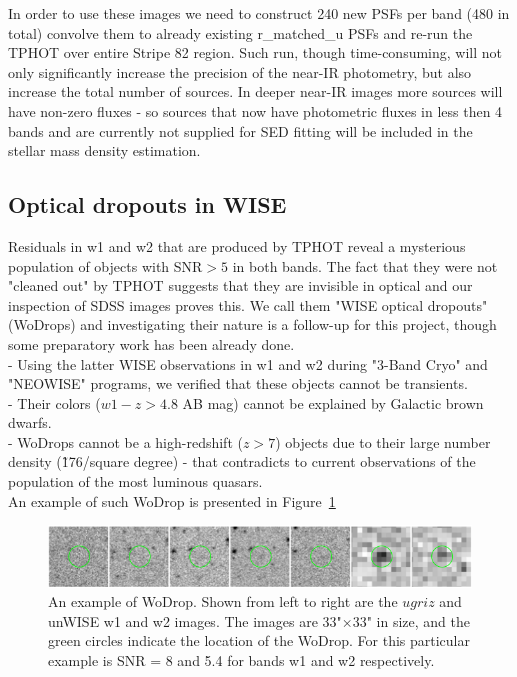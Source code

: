In order to use these images we need to construct 240 new PSFs per band (480 in total) convolve them to already existing r\_matched\_u PSFs and re-run the TPHOT over entire Stripe 82 region. Such run, though time-consuming, will not only significantly increase the precision of the near-IR photometry, but also increase the total number of sources. In deeper near-IR images more sources will have non-zero fluxes - so sources that now have photometric fluxes in less then 4 bands and are currently not supplied for SED fitting will be included in the stellar mass density estimation. 

\subsection{Optical dropouts in WISE}
Residuals in w1 and w2 that are produced by TPHOT reveal a mysterious population of objects with SNR$>5$ in both bands. The fact that they were not "cleaned out" by TPHOT suggests that they are invisible in optical and our inspection of SDSS images proves this. We call them "WISE optical dropouts" (WoDrops) and investigating their nature is a follow-up for this project, though some preparatory work has been already done.\\
- Using the latter WISE observations in w1 and w2 during "3-Band Cryo" and "NEOWISE" programs, we verified that these objects cannot be transients.\\
- Their colors ($w1-z>4.8$ AB mag) cannot be explained by Galactic brown dwarfs.\\
- WoDrops cannot be a high-redshift ($z>7$) objects due to their large number density (\~176/square degree) - that contradicts to current observations of the population of the most luminous quasars.\\
An example of such WoDrop is presented in Figure~\ref{fig:wodrop_sdss}

\begin{figure}[!ht]
\includegraphics[width=6in]{Figures/wodrop_sdss_w1w2.png}
\caption{An example of WoDrop. Shown from left to right are the $ugriz$ and unWISE w1 and w2 images. The images are 33"×33" in size, and
the green circles indicate the location of the WoDrop. For this particular example is SNR = 8 and 5.4 for bands w1 and w2 respectively.}
\label{fig:wodrop_sdss}
\end{figure}

